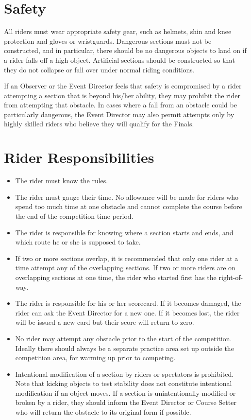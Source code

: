 \section{Safety}
All riders must wear appropriate safety gear, such as helmets, shin and knee protection and gloves or wristguards.
Dangerous sections must not be constructed, and in particular, there should be no dangerous objects to land on if a rider falls off a high object. 
Artificial sections should be constructed so that they do not collapse or fall over under normal riding conditions.

If an Observer or the Event Director feels that safety is compromised by a rider attempting a section that is beyond his/her
ability, they may prohibit the rider from attempting that obstacle. 
In cases where a fall from an obstacle could be particularly dangerous, the Event Director may also permit attempts only by highly skilled riders who believe they will qualify for the Finals.

\section{Rider Responsibilities}
\begin{itemize}
\item The rider must know the rules.
\item The rider must gauge their time. 
No allowance will be made for riders who spend too much time at one obstacle and cannot complete the course before the end of the competition time period.
\item The rider is responsible for knowing where a section starts and ends, and which route he or she is supposed to take.
\item If two or more sections overlap, it is recommended that only one rider at a time attempt any of the overlapping sections. 
If two or more riders are on overlapping sections at one time, the rider who started first has the right-of-way.
\item The rider is responsible for his or her scorecard. 
If it becomes damaged, the rider can ask the Event Director for a new one. 
If it becomes lost, the rider will be issued a new card but their score will return to zero.
\item No rider may attempt any obstacle prior to the start of the competition. 
Ideally there should always be a separate practice area set up outside the competition area, for warming up prior to competing.
\item Intentional modification of a section by riders or spectators is prohibited. 
Note that kicking objects to test stability does not constitute intentional modification if an object moves. 
If a section is unintentionally modified or broken by a rider, they should inform the Event Director or Course Setter who will return the obstacle to its original form if possible.
\end{itemize}

